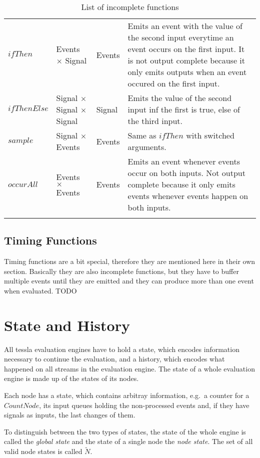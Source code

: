 \begin{longtable}{lp{3cm}lp{6cm}}
  \(\mathit{ifThen}\)           & Events \(\times\) Signal  & Events  & Emits an event with the value of the second input everytime an event occurs on the first input. It is not output complete because it only emits outputs when an event occured on the first input. \\
  \(\mathit{ifThenElse}\)       & Signal \(\times\) Signal \newline \(\times\) Signal  & Signal  & Emits the value of the second input inf the first is true, else of the third input.\\
  \(\mathit{sample}\)           & Signal \(\times\) Events  & Events  & Same as \(\mathit{ifThen}\) with switched arguments. \\
  \(\mathit{occurAll}\)         & Events \(\times\) Events  & Events  & Emits an event whenever events occur on both inputs. Not output complete because it only emits events whenever events happen on both inputs.\\
  \caption{List of incomplete functions}
\label{table:incomplete_functions}
\end{longtable}

\subsection{Timing Functions}
\label{sec:definitions:tessla_functions:timing}

Timing functions are a bit special, therefore they are mentioned here in their own section.
Basically they are also incomplete functions, but they have to buffer multiple events until they are emitted and they can produce more than one event when evaluated.
TODO

\section{State and History}
\label{sec:definitions:state}

All \gls{tessla} evaluation engines have to hold a state, which encodes information necessary to continue the evaluation, and a history, which encodes what happened on all streams in the evaluation engine.
The state of a whole evaluation engine is made up of the states of its nodes.

Each node has a state, which contains arbitray information, e.g.\ a counter for a \(\mathit{CountNode}\), its input queues holding the non-processed events and, if they have signals as inputs, the last changes of them.

To distinguish between the two types of states, the state of the whole engine is called the \emph{global state} and the state of a single node the \emph{node state}.
The set of all valid node states is called \(\widetilde{N}\).


